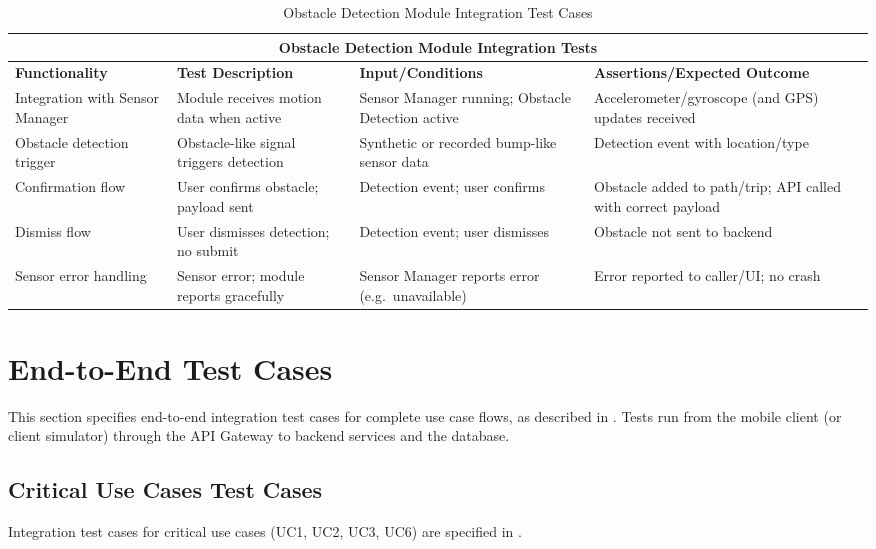 \begin{table}[ht]
\centering
\begin{tabular}{|p{3.2cm}|p{3.8cm}|p{3.2cm}|p{4.8cm}|}
\hline
\multicolumn{4}{|c|}{\textbf{Obstacle Detection Module Integration Tests}} \\ 
\hline
\textbf{Functionality} & \textbf{Test Description} & \textbf{Input/Conditions} & \textbf{Assertions/Expected Outcome} \\
\hline
Integration with Sensor Manager
 & Module receives motion data when active
 & Sensor Manager running; Obstacle Detection active
 & Accelerometer/gyroscope (and GPS) updates received \\ \hline
Obstacle detection trigger
 & Obstacle-like signal triggers detection
 & Synthetic or recorded bump-like sensor data
 & Detection event with location/type \\ \hline
Confirmation flow
 & User confirms obstacle; payload sent
 & Detection event; user confirms
 & Obstacle added to path/trip; API called with correct payload \\ \hline
Dismiss flow
 & User dismisses detection; no submit
 & Detection event; user dismisses
 & Obstacle not sent to backend \\ \hline
Sensor error handling
 & Sensor error; module reports gracefully
 & Sensor Manager reports error (e.g.\ unavailable)
 & Error reported to caller/UI; no crash \\ \hline
\end{tabular}
\caption{Obstacle Detection Module Integration Test Cases}
\label{tab:test_cases_obstacle_detection}
\end{table}

\section{End-to-End Test Cases}
\label{sec:end_to_end_test_cases}%

This section specifies end-to-end integration test cases for complete use case flows, as described in . Tests run from the mobile client (or client simulator) through the API Gateway to backend services and the database.

\subsection{Critical Use Cases Test Cases}
\label{subsec:critical_use_cases_test_cases}%

Integration test cases for critical use cases (UC1, UC2, UC3, UC6) are specified in .

